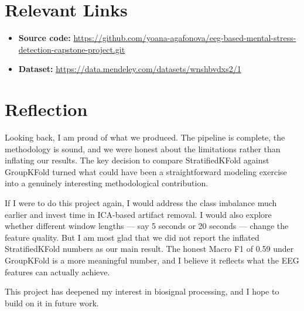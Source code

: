 \documentclass[12pt,a4paper]{article}
\begin{document}
\section*{Relevant Links}

\begin{itemize}
    \item \textbf{Source code:} \url{https://github.com/yoana-agafonova/eeg-based-mental-stress-detection-capstone-project.git}
    \item \textbf{Dataset:} \url{https://data.mendeley.com/datasets/wnshbvdxs2/1}
\end{itemize}

\section*{Reflection}

Looking back, I am proud of what we produced. The pipeline is complete, the methodology is sound, and we were honest about the limitations rather than inflating our results. The key decision to compare StratifiedKFold against GroupKFold turned what could have been a straightforward modeling exercise into a genuinely interesting methodological contribution.

If I were to do this project again, I would address the class imbalance much earlier and invest time in ICA-based artifact removal. I would also explore whether different window lengths --- say 5 seconds or 20 seconds --- change the feature quality. But I am most glad that we did not report the inflated StratifiedKFold numbers as our main result. The honest Macro F1 of 0.59 under GroupKFold is a more meaningful number, and I believe it reflects what the EEG features can actually achieve.

This project has deepened my interest in biosignal processing, and I hope to build on it in future work.
\end{document}
